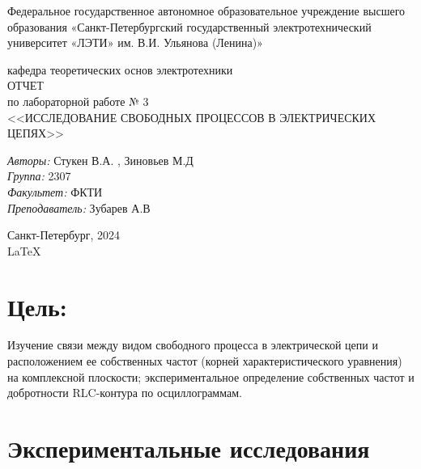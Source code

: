\documentclass[a4paper,12pt]{report}
\begin{document}
 

\begin{titlepage} 

\begin{center} 

\large Федеральное государственное автономное образовательное учреждение высшего образования «Санкт-Петербургский государственный электротехнический университет «ЛЭТИ» им. В.И. Ульянова (Ленина)»

кафедра теоретических основ электротехники\\[5cm] 

\huge ОТЧЕТ\\ по лабораторной работе № 3\\[0.5cm] 
\large <<ИССЛЕДОВАНИЕ СВОБОДНЫХ ПРОЦЕССОВ В ЭЛЕКТРИЧЕСКИХ ЦЕПЯХ>>\\[3.7cm]

\begin{minipage}{1\textwidth} 
    \begin{flushleft} 
        \emph{Авторы:} Стукен В.А. , Зиновьев М.Д\\
        \emph{Группа:} 2307\\
        \emph{Факультет:} ФКТИ\\
        \emph{Преподаватель:} Зубарев А.В
    \end{flushleft} 
\end{minipage} 

\vfill 

Санкт-Петербург, 2024\\
{\large \LaTeX} 

\end{center} 

\thispagestyle{empty} 
\end{titlepage} 

\section*{Цель:}
Изучение связи между видом свободного процесса в электрической цепи и расположением ее собственных частот (корней характеристического уравнения) на комплексной плоскости; экспериментальное определение собственных частот и добротности RLC-контура по осциллограммам.

\section*{Экспериментальные исследования}
\end{document}
